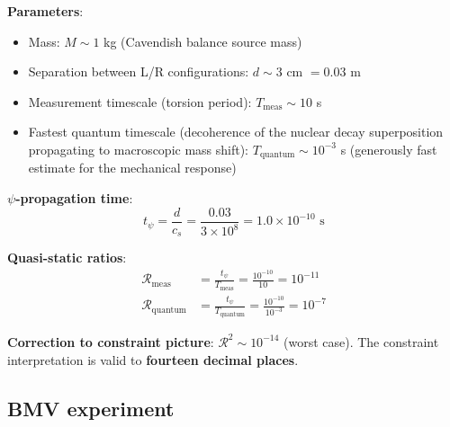 \documentclass[12pt,a4paper]{article}
\begin{document}
\begin{tcolorbox}[colback=blue!5!white, colframe=dfdblue,
title=Page--Geilker: Detailed Computation]
\textbf{Parameters}:
\begin{itemize}
\item Mass: $M \sim 1$ kg (Cavendish balance source mass)
\item Separation between L/R configurations: $d \sim 3$ cm $= 0.03$ m
\item Measurement timescale (torsion period): $T_\mathrm{meas} \sim 10$ s
\item Fastest quantum timescale (decoherence of the nuclear decay
      superposition propagating to macroscopic mass shift): $T_\mathrm{quantum}
      \sim 10^{-3}$ s (generously fast estimate for the mechanical response)
\end{itemize}

\textbf{$\psi$-propagation time}:
\begin{equation}
t_\psi = \frac{d}{c_s} = \frac{0.03}{3 \times 10^8} = 1.0 \times 10^{-10}\text{ s}
\end{equation}

\textbf{Quasi-static ratios}:
\begin{align}
\mathcal{R}_\mathrm{meas} &= \frac{t_\psi}{T_\mathrm{meas}}
= \frac{10^{-10}}{10} = 10^{-11} \\[6pt]
\mathcal{R}_\mathrm{quantum} &= \frac{t_\psi}{T_\mathrm{quantum}}
= \frac{10^{-10}}{10^{-3}} = 10^{-7}
\end{align}

\textbf{Correction to constraint picture}:
$\mathcal{R}^2 \sim 10^{-14}$ (worst case). The constraint
interpretation is valid to \textbf{fourteen decimal places}.
\end{tcolorbox}

\subsection{BMV experiment}
\end{document}
